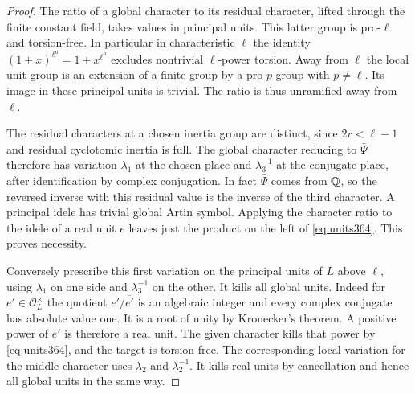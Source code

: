 \documentclass[a4paper,11pt]{article}
\theoremstyle{definition}
\theoremstyle{remark}
\numberwithin{equation}{section}
\begin{document}
\begin{proof}
The ratio of a global character to its residual character,
lifted through the finite constant field, takes values in
principal units. This latter group is pro-\(\ell\) and
torsion-free. In particular in characteristic \(\ell\) the
identity \((1+x)^{\ell^a}=1+x^{\ell^a}\) excludes nontrivial
\(\ell\)-power torsion. Away from \(\ell\) the local unit group
is an extension of a finite group by a pro-\(p\) group with
\(p\ne\ell\). Its image in these principal units is trivial.
The ratio is thus unramified away from \(\ell\).

The residual characters at a chosen inertia group are distinct,
since \(2r<\ell-1\) and residual cyclotomic inertia is full.
The global character reducing to \(\bar\Psi\) therefore has
variation \(\lambda_1\) at the chosen place and
\(\lambda_3^{-1}\) at the conjugate place, after identification
by complex conjugation. In fact \(\bar\Psi\) comes from
\(\mathbb Q\), so the reversed inverse with this residual value is
the inverse of the third character. A principal idele has
trivial global Artin symbol. Applying the character ratio to
the idele of a real unit \(e\) leaves just the product on
the left of \eqref{eq:units364}. This proves necessity.

Conversely prescribe this first variation on the principal
units of \(L\) above \(\ell\), using \(\lambda_1\) on one side
and \(\lambda_3^{-1}\) on the other. It kills all global units.
Indeed for \(e'\in\mathcal O_L^\times\) the quotient
\(e'/\overline{e'}\) is an algebraic integer and every complex
conjugate has absolute value one. It is a root of unity by
Kronecker's theorem. A positive power of \(e'\) is therefore
a real unit. The given character kills that power by
\eqref{eq:units364}, and the target is torsion-free.
The corresponding local variation for the middle character
uses \(\lambda_2\) and \(\lambda_2^{-1}\). It kills real units
by cancellation and hence all global units in the same way.


\end{proof}
\end{document}
